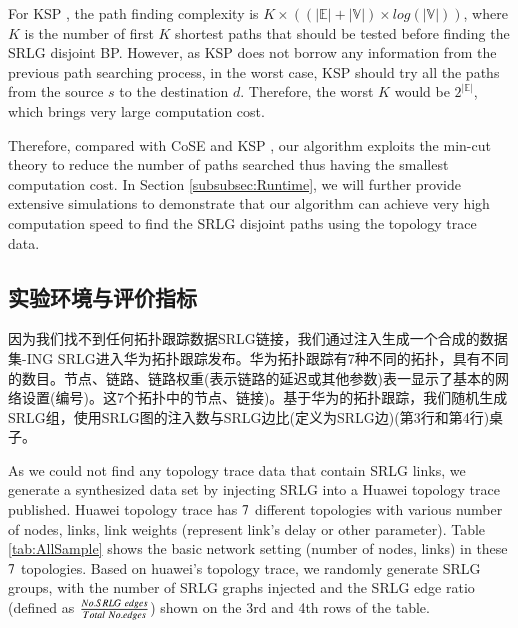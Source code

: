For KSP \cite{eppstein1998finding}, the path finding complexity is $K\times ((|\mathbb{E}|+|\mathbb{V}|)\times log(|\mathbb{V}|))$, where $K$ is the number of first $K$ shortest paths that should be tested before finding the SRLG disjoint BP. However, as KSP does not borrow any information from the previous path searching process, in the worst case, KSP should try all the paths from the source $s$ to the destination $d$. Therefore, the worst $K$ would be  $2^{|\mathbb{E}|}$, which brings very large computation cost.

Therefore, compared with  CoSE \cite{rostami2007cose} and KSP \cite{eppstein1998finding}, our algorithm exploits the min-cut theory to reduce the number of paths searched thus having the smallest computation cost.  In Section \ref{subsubsec:Runtime}, we will further provide extensive simulations to demonstrate that our algorithm can achieve very high computation speed to find the SRLG disjoint paths using the topology trace data.

\subsection{实验环境与评价指标}

因为我们找不到任何拓扑跟踪数据SRLG链接，我们通过注入生成一个合成的数据集-ING SRLG进入华为拓扑跟踪发布。华为拓扑跟踪有7种不同的拓扑，具有不同的数目。节点、链路、链路权重(表示链路的延迟或其他参数)表一显示了基本的网络设置(编号)。这7个拓扑中的节点、链接)。基于华为的拓扑跟踪，我们随机生成SRLG组，使用SRLG图的注入数与SRLG边比(定义为SRLG边)(第3行和第4行)桌子。


As we could not find any topology trace data that contain SRLG links, we generate a synthesized data  set by injecting SRLG into a Huawei topology trace published. Huawei topology trace has $7$ different topologies with various number of nodes, links, link weights (represent link's delay or other parameter). Table \ref{tab:AllSample} shows the basic network setting (number of nodes, links) in these $7$ topologies. Based on huawei's topology trace, we randomly generate SRLG groups, with the number of SRLG graphs injected and the SRLG edge ratio (defined as $\frac{{No.SRLG \  {\rm{ }}edges}}{{Total \  {\rm{ }}No.edges}}$) shown on the 3rd and 4th rows of the table.







